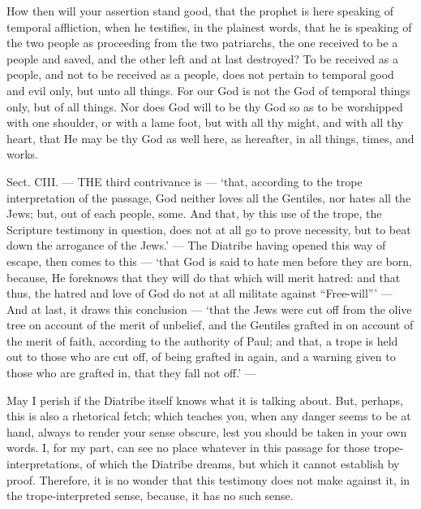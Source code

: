 How then will your assertion stand good, that the prophet is here speaking of temporal affliction, when he testifies, in the plainest words, that he is speaking of the two people as proceeding from the two patriarchs, the one received to be a people and saved, and the other left and at last destroyed? To be received as a people, and not to be received as a people, does not pertain to temporal good and evil only, but unto all things. For our God is not the God of temporal things only, but of all things. Nor does God will to be thy God so as to be worshipped with one shoulder, or with a lame foot, but with all thy might, and with all thy heart, that He may be thy God as well here, as hereafter, in all things, times, and works.


Sect. CIII. — THE third contrivance is — ‘that, according to the trope interpretation of the passage, God neither loves all the Gentiles, nor hates all the Jews; but, out of each people, some. And that, by this use of the trope, the Scripture testimony in question, does not at all go to prove necessity, but to beat down the arrogance of the Jews.’ — The Diatribe having opened this way of escape, then comes to this — ‘that God is said to hate men before they are born, because, He foreknows that they will do that which will merit hatred: and that thus, the hatred and love of God do not at all militate against “Free-will”’ — And at last, it draws this conclusion — ‘that the Jews were cut off from the olive tree on account of the merit of unbelief, and the Gentiles grafted in on account of the merit of faith, according to the authority of Paul; and that, a trope is held out to those who are cut off, of being grafted in again, and a warning given to those who are grafted in, that they fall not off.’ —

May I perish if the Diatribe itself knows what it is talking about. But, perhaps, this is also a rhetorical fetch; which teaches you, when any danger seems to be at hand, always to render your sense obscure, lest you should be taken in your own words. I, for my part, can see no place whatever in this passage for those trope-interpretations, of which the Diatribe dreams, but which it cannot establish by proof. Therefore, it is no wonder that this testimony does not make against it, in the trope-interpreted sense, because, it has no such sense.

